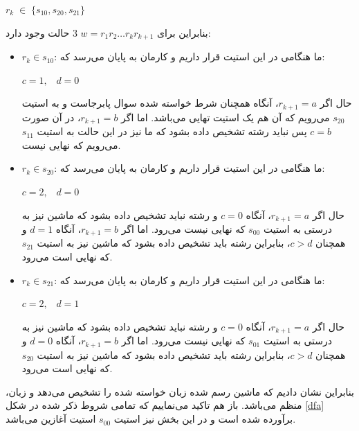 \begin{enumerate}
\begin{enumerate}
\begin{center}
        $r_{k}\;\in\;\{s_{10},s_{20},s_{21}\}$\\[0.15in]
    \end{center}
\end{enumerate}
بنابراین برای $w = r_1r_2\ldots r_{k}r_{k+1}$ 3 حالت وجود دارد:\newline
\begin{itemize}
    \item $r_{k}\in s_{10}$:
    ما هنگامی در این استیت قرار داریم و کارمان به پایان می‌رسد که:\\[0.05in]
    \begin{center}
        $c = 1,\;\;\; d = 0$\newline
    \end{center}
    حال اگر $r_{k+1} = a$، آنگاه همچنان شرط خواسته شده سوال پابرجاست و به استیت
    $s_{20}$ می‌رویم که آن هم یک استیت تهایی می‌باشد. اما اگر 
    $r_{k+1} = b$، در آن صورت $c = b$ پس نباید رشته تشخیص داده بشود که ما نیز در این حالت به استیت $s_{11}$ می‌رویم که نهایی نیست.\newline
    \item $r_{k}\in s_{20}$:
        ما هنگامی در این استیت قرار داریم و کارمان به پایان می‌رسد که:\\[0.05in]
    \begin{center}
        $c = 2,\;\;\; d = 0$\newline
    \end{center}
    حال اگر $r_{k+1} = a$، آنگاه $c = 0$ و رشته نباید تشخیص داده بشود که ماشین نیز به درستی به استیت $s_{00}$ که نهایی نیست می‌رود.
    اما اگر $r_{k+1}=b$، آنگاه $d=1$ و همچنان $c>d$، بنابراین رشته باید تشخیص داده بشود که ماشین نیز به استیت $s_{21}$ که نهایی است می‌رود.\newline
    \item $r_{k}\in s_{21}$:
        ما هنگامی در این استیت قرار داریم و کارمان به پایان می‌رسد که:\\[0.05in]
    \begin{center}
        $c = 2,\;\;\; d = 1$\newline
    \end{center}
    حال اگر $r_{k+1} = a$، آنگاه $c = 0$ و رشته نباید تشخیص داده بشود که ماشین نیز به درستی به استیت $s_{01}$ که نهایی نیست می‌رود.
اما اگر $r_{k+1}=b$، آنگاه $d=0$ و همچنان $c>d$، بنابراین رشته باید تشخیص داده بشود که ماشین نیز به استیت $s_{20}$ که نهایی است می‌رود.\newline
\end{itemize}
بنابراین نشان دادیم که ماشین رسم شده زبان خواسته شده را تشخیص می‌دهد و زبان، منظم می‌باشد.
باز هم تاکید می‌نماییم که تمامی شروط ذکر شده در شکل \ref{dfa} برآورده شده است و در این بخش نیز استیت $s_{00}$ استیت آغازین می‌باشد.
\end{enumerate}